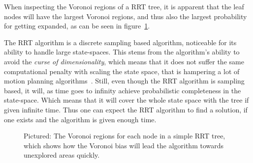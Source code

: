 When inspecting the Voronoi regions of a \ac{RRT} tree, it is apparent that the
leaf nodes will have the largest Voronoi regions, and thus also the largest
probability for getting expanded, as can be seen in
figure~\cref{fig:rrt-voronoi}.

The \ac{RRT} algorithm is a discrete sampling based algorithm, noticeable for
its ability to handle large state-spaces. This stems from the algorithm's
ability to avoid the \textit{curse of dimensionality}, which means that it does
not suffer the same computational penalty with scaling the state space, that is
hampering a lot of motion planning algorithms~\cite{Lav06}. Still, even though
the \ac{RRT} algorithm is sampling based, it will, as time goes to infinity
achieve probabilistic completeness in the state-space. Which means that it will
cover the whole state space with the tree if given infinite time. Thus one can
expect the \ac{RRT} algorithm to find a solution, if one exists and the
algorithm is given enough time.

\begin{figure}
  \centering {}
  \caption{Pictured: The Voronoi regions for each node in a simple RRT tree,
    which shows how the Voronoi bias will lead the algorithm towards unexplored
    areas quickly.}
  \label{fig:rrt-voronoi}
\end{figure}

